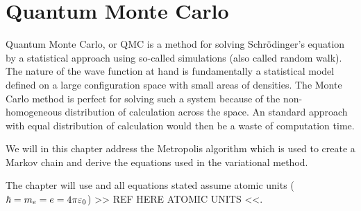 \section{Quantum Monte Carlo\label{sec:QMC}}
    Quantum Monte Carlo, or QMC is a method for solving Schrödinger's equation
    by a statistical approach using so-called  simulations
    (also called random walk). The nature of the wave function at hand is
    fundamentally a statistical model defined on a large configuration space
    with small areas of densities. The Monte Carlo method is perfect for
    solving such a system because of the non-homogeneous distribution of
    calculation across the space. An standard approach with equal distribution
    of calculation would then be a waste of computation time. 

    We will in this chapter address the Metropolis algorithm which is used to
    create a Markov chain and derive the equations used in the variational
    method.

    The chapter will use  \cite{GriffQuan} and all
    equations stated assume atomic units ($\hbar=m_e=e=4\pi\varepsilon_0$) >> REF
    HERE ATOMIC UNITS <<.

